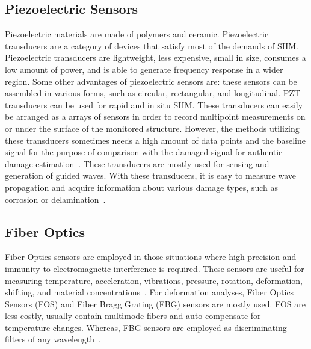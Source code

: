 \documentclass[b5paper, 11pt, titlepage]{book}
\begin{document}
\subsection{Piezoelectric Sensors}
Piezoelectric materials are made of polymers and ceramic. Piezoelectric transducers are a category of devices that satisfy most of the demands of SHM. Piezoelectric transducers are lightweight, less expensive, small in size, consumes a low amount of power, and is able to generate frequency response in a wider region. Some other advantages of piezoelectric sensors are: these sensors can be assembled in various forms, such as circular, rectangular, and longitudinal. PZT transducers can be used for rapid and in situ SHM. These transducers can easily be arranged as a arrays of sensors in order to record multipoint measurements on or under the surface of the monitored structure. However, the methods utilizing these transducers sometimes needs a high amount of data points and the baseline signal for the purpose of comparison with the damaged signal for authentic damage estimation~\cite{Farrar2012,Hameed2019}.
These transducers are mostly used for sensing and generation of guided waves. With these transducers, it is easy to measure wave propagation and acquire information about various damage types, such as corrosion or delamination~\cite{TibaduizaBurgos2020,Mitra2016}.

\subsection{Fiber Optics}
Fiber Optics sensors are employed in those situations where high precision and immunity to electromagnetic-interference is required. These sensors are useful for measuring temperature, acceleration, vibrations, pressure, rotation, deformation, shifting, and material concentrations~\cite{TibaduizaBurgos2020}. For deformation analyses, Fiber Optics Sensors (FOS) and Fiber Bragg Grating (FBG) sensors are mostly used. FOS are less costly, usually contain multimode fibers and auto-compensate for temperature changes. Whereas, FBG sensors are employed as discriminating filters of any wavelength~\cite{TibaduizaBurgos2020}. 
\end{document}

